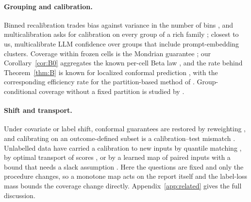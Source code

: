 \documentclass[twoside]{article}
\theoremstyle{definition}
\theoremstyle{remark}
\newcommand{\1}{\mathbf{1}}
\begin{document}
\paragraph{Grouping and calibration.} Binned recalibration trades bias against variance in the number of bins
\citep{kumar2019verified,gupta2021distribution,sun2023minimum}, and multicalibration asks for calibration on every
group of a rich family \citep{hebertjohnson2018multicalibration,kim2019multiaccuracy}; closest to us,
\citet{detommaso2024multicalibration} multicalibrate LLM confidence over groups that include prompt-embedding
clusters. Coverage within frozen cells is the Mondrian guarantee \citep{vovk2005algorithmic,vovk2012conditional};
our Corollary~\ref{cor:B0} aggregates the known per-cell Beta law \citep{ding2023class}, and the rate behind
Theorem~\ref{thm:B} is known for localized conformal prediction \citep{conrad2026beyond,min2026unified}, with the
corresponding efficiency rate for the partition-based method of \citet{lei2014distribution}. Group-conditional
coverage without a fixed partition is studied by \citet{gibbs2023conformal}.

\paragraph{Shift and transport.} Under covariate or label shift, conformal guarantees are restored by reweighting
\citep{tibshirani2019conformal,podkopaev2021distribution}, and calibrating on an outcome-defined subset is a
calibration--test mismatch \citep{wang2026trimming}. Unlabelled data have carried a calibration to new inputs by
quantile matching \citep{yilmaz2022testtime}, by optimal transport of scores \citep{correia2025nonexchangeable}, or
by a learned map of paired inputs with a bound that needs a slack assumption \citep{doula2026conformal}. Here the
questions are fixed and only the procedure changes, so a monotone map acts on the report itself and the label-loss
mass bounds the coverage change directly. Appendix~\ref{app:related} gives the full discussion.

\end{document}
